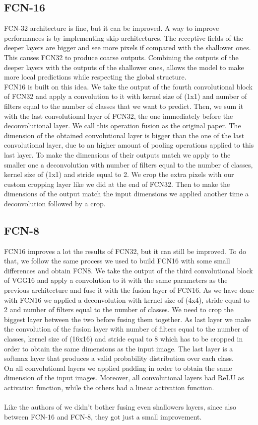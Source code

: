 \documentclass[10pt,twocolumn,letterpaper]{article}
\begin{document}
\subsection{FCN-16}
FCN-32 architecture is fine, but it can be improved. A way to improve performances is by implementing skip architectures. The receptive fields of the deeper layers are bigger and see more pixels if compared with the shallower ones. This causes FCN32 to produce coarse outputs. Combining the outputs of the deeper layers with the outputs of the shallower ones, allows the model to make more local predictions while respecting the global structure. \\
FCN16 is built on this idea. We take the output of the fourth convolutional block of FCN32 and apply a convolution to it with kernel size of (1x1) and number of filters equal to the number of classes that we want to predict. Then, we sum it with the last convolutional layer of FCN32, the one immediately before the deconvolutional layer. We call this operation fusion  as the original paper. The dimension of the obtained convolutional layer is bigger than the one of the last convolutional layer, due to an higher amount of pooling operations applied to this last layer. 
To make the dimensions of their outputs match we apply to the smaller one a deconvolution with number of filters equal to the number of classes, kernel size of (1x1) and stride equal to 2. We crop the extra pixels with our custom cropping layer like we did at the end of FCN32. Then to make the dimensions of the output match the input dimensions we applied another time a deconvolution followed by a crop.
\subsection{FCN-8}
FCN16 improves a lot the results of FCN32, but it can still be improved. To do that, we follow the same process we used to build FCN16 with some small differences and obtain FCN8.
We take the output of the third convolutional block of VGG16 and apply a convolution to it with the same parameters as the previous architecture and fuse it with the fusion layer of FCN16. As we have done with FCN16 we applied a deconvolution with kernel size of (4x4), stride equal to 2 and number of filters equal to the number of classes. We need to crop the biggest layer between the two before fusing them together. As last layer we make the convolution of the fusion layer with number of filters equal to the number of classes, kernel size of (16x16) and stride equal to 8 which has to be cropped in order to obtain the same dimensions as the input image. The last layer is a softmax layer that produces a valid probability distribution over each class. \\
On all convolutional layers we applied padding in order to obtain the same dimension of the input images. Moreover, all convolutional layers had ReLU as activation function, while the others had a linear activation function. \\ \\
Like the authors of \cite{projectPaper} we didn't bother fusing even shallowers layers, since also between FCN-16 and FCN-8, they got just a small improvement.
\end{document}
